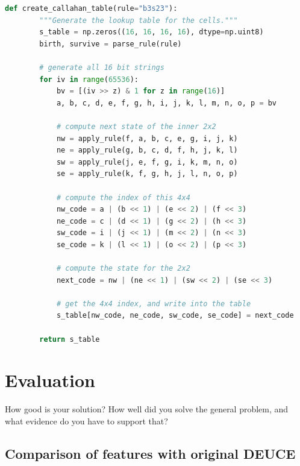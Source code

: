 \documentclass{l4proj}
\begin{document}
\begin{lstlisting}[language=python, float, caption={The algorithm for packing the $3\times 3$ outer-totalistic binary CA successor rule into a 
    $16\times 16\times 16\times 16$ 4 bit lookup table, running an equivalent, notionally 16-state $2\times 2$ CA.}, label=lst:callahan]
    def create_callahan_table(rule="b3s23"):
        """Generate the lookup table for the cells."""        
        s_table = np.zeros((16, 16, 16, 16), dtype=np.uint8)
        birth, survive = parse_rule(rule)

        # generate all 16 bit strings
        for iv in range(65536):
            bv = [(iv >> z) & 1 for z in range(16)]
            a, b, c, d, e, f, g, h, i, j, k, l, m, n, o, p = bv

            # compute next state of the inner 2x2
            nw = apply_rule(f, a, b, c, e, g, i, j, k)
            ne = apply_rule(g, b, c, d, f, h, j, k, l)
            sw = apply_rule(j, e, f, g, i, k, m, n, o)
            se = apply_rule(k, f, g, h, j, l, n, o, p)

            # compute the index of this 4x4
            nw_code = a | (b << 1) | (e << 2) | (f << 3)
            ne_code = c | (d << 1) | (g << 2) | (h << 3)
            sw_code = i | (j << 1) | (m << 2) | (n << 3)
            se_code = k | (l << 1) | (o << 2) | (p << 3)

            # compute the state for the 2x2
            next_code = nw | (ne << 1) | (sw << 2) | (se << 3)

            # get the 4x4 index, and write into the table
            s_table[nw_code, ne_code, sw_code, se_code] = next_code

        return s_table

\end{lstlisting}

\chapter{Evaluation} 
How good is your solution? How well did you solve the general problem, and what evidence do you have to support that?
\section{Comparison of features with original DEUCE}
\end{document}
